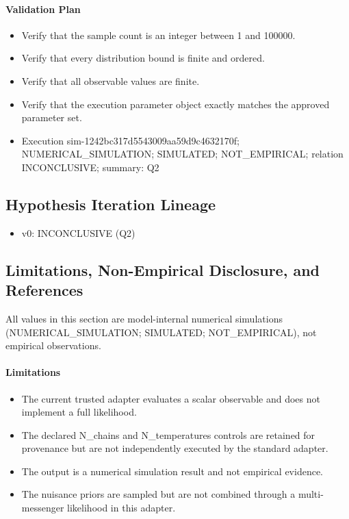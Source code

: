 \documentclass[11pt]{article}
\begin{document}
\paragraph{Validation Plan}
\begin{itemize}\raggedright
\item Verify that the sample count is an integer between 1 and 100000.
\item Verify that every distribution bound is finite and ordered.
\item Verify that all observable values are finite.
\item Verify that the execution parameter object exactly matches the approved parameter set.
\end{itemize}

\begin{itemize}
\item Execution sim-1242bc317d5543009aa59d9c4632170f; NUMERICAL\_SIMULATION; SIMULATED; NOT\_EMPIRICAL; relation INCONCLUSIVE; summary: Q2
\end{itemize}

\subsection{Hypothesis Iteration Lineage}

\begin{itemize}\raggedright
\item v0: INCONCLUSIVE (Q2)
\end{itemize}

\subsection{Limitations, Non-Empirical Disclosure, and References}

\noindent All values in this section are model-internal numerical simulations (NUMERICAL\_SIMULATION; SIMULATED; NOT\_EMPIRICAL), not empirical observations.

\paragraph{Limitations}
\begin{itemize}\raggedright
\item The current trusted adapter evaluates a scalar observable and does not implement a full likelihood.
\item The declared N\_\allowbreak{}chains and N\_\allowbreak{}temperatures controls are retained for provenance but are not independently executed by the standard adapter.
\item The output is a numerical simulation result and not empirical evidence.
\item The nuisance priors are sampled but are not combined through a multi-messenger likelihood in this adapter.
\end{itemize}
\end{document}
